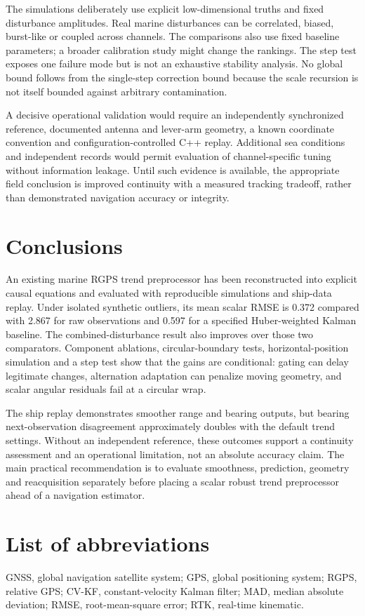 \documentclass[12pt,a4paper]{article}
\begin{document}
The simulations deliberately use explicit low-dimensional truths and fixed disturbance amplitudes. Real marine disturbances can be correlated, biased, burst-like or coupled across channels. The comparisons also use fixed baseline parameters; a broader calibration study might change the rankings. The step test exposes one failure mode but is not an exhaustive stability analysis. No global bound follows from the single-step correction bound because the scale recursion is not itself bounded against arbitrary contamination.

A decisive operational validation would require an independently synchronized reference, documented antenna and lever-arm geometry, a known coordinate convention and configuration-controlled C++ replay. Additional sea conditions and independent records would permit evaluation of channel-specific tuning without information leakage. Until such evidence is available, the appropriate field conclusion is improved continuity with a measured tracking tradeoff, rather than demonstrated navigation accuracy or integrity.

\section{Conclusions}
An existing marine RGPS trend preprocessor has been reconstructed into explicit causal equations and evaluated with reproducible simulations and ship-data replay. Under isolated synthetic outliers, its mean scalar RMSE is 0.372 compared with 2.867 for raw observations and 0.597 for a specified Huber-weighted Kalman baseline. The combined-disturbance result also improves over those two comparators. Component ablations, circular-boundary tests, horizontal-position simulation and a step test show that the gains are conditional: gating can delay legitimate changes, alternation adaptation can penalize moving geometry, and scalar angular residuals fail at a circular wrap.

The ship replay demonstrates smoother range and bearing outputs, but bearing next-observation disagreement approximately doubles with the default trend settings. Without an independent reference, these outcomes support a continuity assessment and an operational limitation, not an absolute accuracy claim. The main practical recommendation is to evaluate smoothness, prediction, geometry and reacquisition separately before placing a scalar robust trend preprocessor ahead of a navigation estimator.

\section*{List of abbreviations}
GNSS, global navigation satellite system; GPS, global positioning system; RGPS, relative GPS; CV-KF, constant-velocity Kalman filter; MAD, median absolute deviation; RMSE, root-mean-square error; RTK, real-time kinematic.
\end{document}
